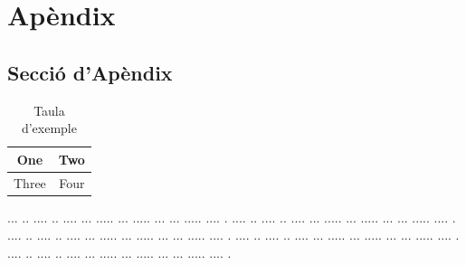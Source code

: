 \documentclass[10pt,a4paper,twocolumn,twoside]{article}
\begin{document}








\appendix

\section*{Apèndix}

\setcounter{section}{1}

    \subsection{Secció d'Apèndix}
    \begin{table}[h]
    \caption{Taula d'exemple}
    \label{tab:senzilla}
    \begin{center}
    \begin{tabular}{|c|c|}
    \hline
    One & Two\\
    \hline
    Three & Four\\
    \hline
    \end{tabular}
    \end{center}
    \end{table}
    
    ... ..  .... .. .... ... ..... ... ..... ... ... ..... .... .
    .... ..  .... .. .... ... ..... ... ..... ... ... ..... .... .
    .... ..  .... .. .... ... ..... ... ..... ... ... ..... .... .
    .... ..  .... .. .... ... ..... ... ..... ... ... ..... .... .
    .... ..  .... .. .... ... ..... ... ..... ... ... ..... .... .
\end{document}
